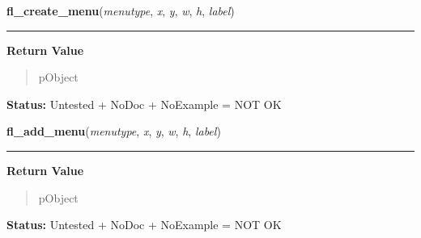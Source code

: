     \label{xformslib:library:fl_create_menu}

    \vspace{0.5ex}

\hspace{.8\funcindent}\begin{boxedminipage}{\funcwidth}

    \raggedright \textbf{fl\_create\_menu}(\textit{menutype}, \textit{x}, \textit{y}, \textit{w}, \textit{h}, \textit{label})

    \vspace{-1.5ex}

    \rule{\textwidth}{0.5\fboxrule}
\setlength{\parskip}{2ex}
\setlength{\parskip}{1ex}
      \textbf{Return Value}
    \vspace{-1ex}

      \begin{quote}
      pObject

      \end{quote}

\textbf{Status:} Untested + NoDoc + NoExample = NOT OK



    \end{boxedminipage}

    \label{xformslib:library:fl_add_menu}

    \vspace{0.5ex}

\hspace{.8\funcindent}\begin{boxedminipage}{\funcwidth}

    \raggedright \textbf{fl\_add\_menu}(\textit{menutype}, \textit{x}, \textit{y}, \textit{w}, \textit{h}, \textit{label})

    \vspace{-1.5ex}

    \rule{\textwidth}{0.5\fboxrule}
\setlength{\parskip}{2ex}
\setlength{\parskip}{1ex}
      \textbf{Return Value}
    \vspace{-1ex}

      \begin{quote}
      pObject

      \end{quote}

\textbf{Status:} Untested + NoDoc + NoExample = NOT OK



    \end{boxedminipage}

